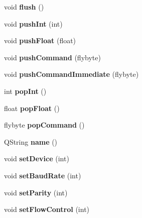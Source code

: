 \begin{DoxyCompactItemize}
void {\bfseries flush} ()
\item 
\hypertarget{class_serial_device_aa8c488f8088ec59d161744b6600c2467}{}\label{class_serial_device_aa8c488f8088ec59d161744b6600c2467} 
void {\bfseries push\+Int} (int)
\item 
\hypertarget{class_serial_device_a43ed2e28372b856b48f2d2468971009d}{}\label{class_serial_device_a43ed2e28372b856b48f2d2468971009d} 
void {\bfseries push\+Float} (float)
\item 
\hypertarget{class_serial_device_afd99c289e7d6dced96d0e436b317a791}{}\label{class_serial_device_afd99c289e7d6dced96d0e436b317a791} 
void {\bfseries push\+Command} (flybyte)
\item 
\hypertarget{class_serial_device_ae24793cd2c237147faf54f07796fdb7e}{}\label{class_serial_device_ae24793cd2c237147faf54f07796fdb7e} 
void {\bfseries push\+Command\+Immediate} (flybyte)
\item 
\hypertarget{class_serial_device_afb083c91c19b5acdbfd0a8324c646bbf}{}\label{class_serial_device_afb083c91c19b5acdbfd0a8324c646bbf} 
int {\bfseries pop\+Int} ()
\item 
\hypertarget{class_serial_device_a86b2c14bab81f0f9d78d90b57626ef90}{}\label{class_serial_device_a86b2c14bab81f0f9d78d90b57626ef90} 
float {\bfseries pop\+Float} ()
\item 
\hypertarget{class_serial_device_a87ee440731e488ff33bda31947c6a303}{}\label{class_serial_device_a87ee440731e488ff33bda31947c6a303} 
flybyte {\bfseries pop\+Command} ()
\item 
\hypertarget{class_serial_device_a97092ec9379ed561866dad21475ea331}{}\label{class_serial_device_a97092ec9379ed561866dad21475ea331} 
Q\+String {\bfseries name} ()
\item 
\hypertarget{class_serial_device_a38f5d9bc555bb1df0a4c8413e494d4b3}{}\label{class_serial_device_a38f5d9bc555bb1df0a4c8413e494d4b3} 
void {\bfseries set\+Device} (int)
\item 
\hypertarget{class_serial_device_af06c6a34b54819e71186243a38606280}{}\label{class_serial_device_af06c6a34b54819e71186243a38606280} 
void {\bfseries set\+Baud\+Rate} (int)
\item 
\hypertarget{class_serial_device_a91e293977d5401ededf350e19846b5a1}{}\label{class_serial_device_a91e293977d5401ededf350e19846b5a1} 
void {\bfseries set\+Parity} (int)
\item 
\hypertarget{class_serial_device_a74968289347c6ede64587287bb0cf699}{}\label{class_serial_device_a74968289347c6ede64587287bb0cf699} 
void {\bfseries set\+Flow\+Control} (int)

\end{DoxyCompactItemize}
